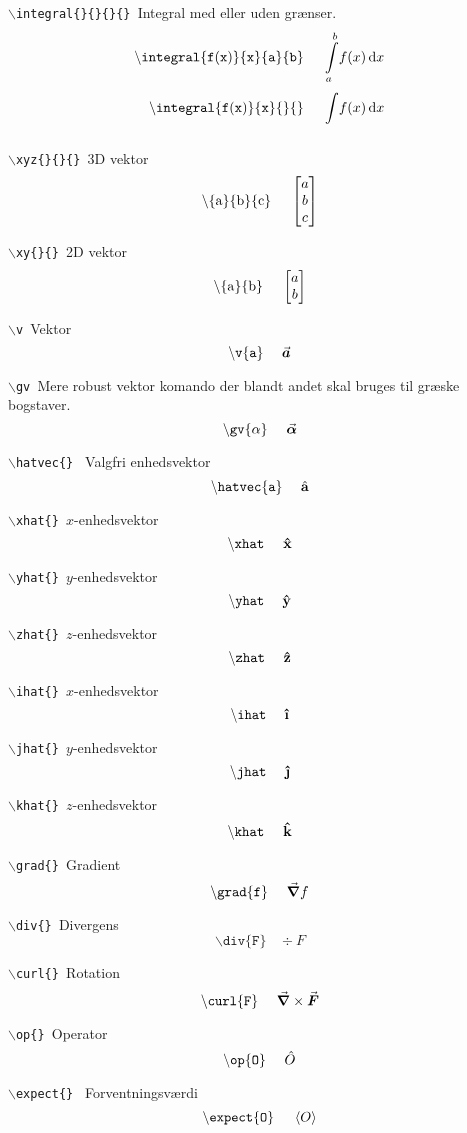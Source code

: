 \documentclass[a4paper,hidelinks,11pt]{memoir}
\begin{document}
\texttt{$\backslash$integral\{\}\{\}\{\}\{\} }Integral med eller uden grænser.
\begin{align*}
\mathtt{\backslash integral\{ f(x)\}\{ x\}\{a\}\{ b\}}~~~~&\integral{f(x)}{x}{a}{b}\\
\mathtt{\backslash integral\{ f(x)\}\{ x\}\{ \}\{ \}}~~~~&\integral{f(x)}{x}{}{}
\end{align*}


\texttt{$\backslash$xyz\{\}\{\}\{\} }3D vektor
$$
\mathrm{\backslash\{ a\}\{ b\}\{ c\}}~~~~\xyz{a}{b}{c}
$$

\texttt{$\backslash$xy\{\}\{\} }2D vektor
$$
\mathrm{\backslash\{ a\}\{ b\}}~~~~\xy{a}{b}
$$

\texttt{$\backslash$v }Vektor
$$
\mathtt{\backslash v\{ a\}}~~~~\v a
$$

\texttt{$\backslash$gv }Mere robust vektor komando der blandt andet skal bruges til græske bogstaver.
$$
\mathtt{\backslash gv\{ \alpha\}}~~~~\gv{\alpha}
$$

\texttt{$\backslash$hatvec\{\} } Valgfri enhedsvektor
$$
\mathtt{\backslash hatvec\{ a\}}~~~~\hatvec{a}
$$

\texttt{$\backslash$xhat\{\} }$x$-enhedsvektor
$$
\mathtt{\backslash xhat}~~~~\xhat
$$

\texttt{$\backslash$yhat\{\} }$y$-enhedsvektor
$$
\mathtt{\backslash yhat}~~~~\yhat
$$

\texttt{$\backslash$zhat\{\} }$z$-enhedsvektor
$$
\mathtt{\backslash zhat}~~~~\zhat
$$

\texttt{$\backslash$ihat\{\} }$x$-enhedsvektor
$$
\mathtt{\backslash ihat}~~~~\ihat
$$

\texttt{$\backslash$jhat\{\} }$y$-enhedsvektor
$$
\mathtt{\backslash jhat}~~~~\jhat
$$

\texttt{$\backslash$khat\{\} }$z$-enhedsvektor
$$
\mathtt{\backslash khat}~~~~\khat
$$

\texttt{$\backslash$grad\{\} }Gradient
$$
\mathtt{\backslash grad\{ f\} }~~~~\grad{f}
$$

\texttt{$\backslash$div\{\} }Divergens
$$
\mathtt{\backslash div\{ F\} }~~~~\div{F}
$$

\texttt{$\backslash$curl\{\} }Rotation
$$
\mathtt{\backslash curl\{ F\} }~~~~\curl{F}
$$

\texttt{$\backslash$op\{\} }Operator
$$
\mathtt{\backslash op\{ O\} }~~~~\op{O}
$$

\texttt{$\backslash$expect\{\} } Forventningsværdi
$$
\mathtt{\backslash expect\{ O\} }~~~~\expect{O}
$$
\end{document}
